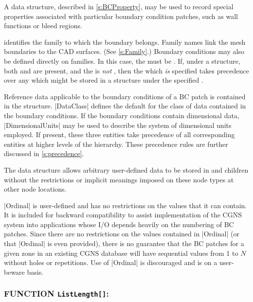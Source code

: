 A  data structure, described in
\autoref{s:BCProperty}, may be used to record special properties
associated with particular boundary condition patches, such as wall
functions or bleed regions.

 identifies the family to which the boundary belongs.
Family names link the mesh boundaries to the CAD surfaces.
(See \autoref{s:Family}.)
Boundary conditions may also be defined directly on families.
In this case, the  must be .
If, under a  structure, both  and
 are present, and the  is \emph{not}
, then the  which \emph{is} specified
takes precedence over any  which might be stored in a
 structure under the specified .

Reference data applicable to the boundary conditions of a BC patch is
contained in the  structure.
|DataClass| defines the default for the class of data contained in the
boundary conditions.
If the boundary conditions contain dimensional data, |DimensionalUnits|
may be used to describe the system of dimensional units employed.
If present, these three entities take precedence of all corresponding
entities at higher levels of the hierarchy.
These precedence rules are further discussed in \autoref{s:precedence}.

The  data structure allows arbitrary
user-defined data to be stored in  and
 children without the restrictions or implicit
meanings imposed on these node types at other node locations.

|Ordinal| is user-defined and has no restrictions on the values that
it can contain.
It is included for backward compatibility to assist implementation of
the CGNS system into applications whose I/O depends heavily on the
numbering of BC patches.
Since there are no restrictions on the values contained in |Ordinal|
(or that |Ordinal| is even provided), there is no guarantee that the
BC patches for a given zone in an existing CGNS database will have
sequential values from 1 to $N$ without holes or repetitions.
Use of |Ordinal| is discouraged and is on a user-beware basis.

\subsubsection*{FUNCTION \texttt{ListLength[]}:}

